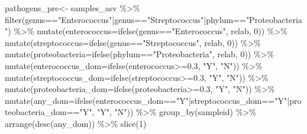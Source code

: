 \documentclass[
]{book}
\newenvironment{Shaded}{\begin{snugshade}}{\end{snugshade}}
\newcommand{\AttributeTok}[1]{\textcolor[rgb]{0.77,0.63,0.00}{#1}}
\newcommand{\DecValTok}[1]{\textcolor[rgb]{0.00,0.00,0.81}{#1}}
\newcommand{\FloatTok}[1]{\textcolor[rgb]{0.00,0.00,0.81}{#1}}
\newcommand{\FunctionTok}[1]{\textcolor[rgb]{0.00,0.00,0.00}{#1}}
\newcommand{\NormalTok}[1]{#1}
\newcommand{\OtherTok}[1]{\textcolor[rgb]{0.56,0.35,0.01}{#1}}
\newcommand{\SpecialCharTok}[1]{\textcolor[rgb]{0.00,0.00,0.00}{#1}}
\newcommand{\StringTok}[1]{\textcolor[rgb]{0.31,0.60,0.02}{#1}}
\begin{document}
\begin{Shaded}
\begin{Highlighting}[]
\NormalTok{pathogens\_pre}\OtherTok{\textless{}{-}}\NormalTok{ samples\_asv }\SpecialCharTok{\%\textgreater{}\%} 
  \FunctionTok{filter}\NormalTok{(genus}\SpecialCharTok{==}\StringTok{"Enterococcus"}\SpecialCharTok{|}\NormalTok{genus}\SpecialCharTok{==}\StringTok{"Streptococcus"}\SpecialCharTok{|}\NormalTok{phylum}\SpecialCharTok{==}\StringTok{"Proteobacteria"}\NormalTok{) }\SpecialCharTok{\%\textgreater{}\%} 
  \FunctionTok{mutate}\NormalTok{(}\AttributeTok{enterococcus=}\FunctionTok{ifelse}\NormalTok{(genus}\SpecialCharTok{==}\StringTok{"Enterococcus"}\NormalTok{, relab, }\DecValTok{0}\NormalTok{)) }\SpecialCharTok{\%\textgreater{}\%} 
  \FunctionTok{mutate}\NormalTok{(}\AttributeTok{streptococcus=}\FunctionTok{ifelse}\NormalTok{(genus}\SpecialCharTok{==}\StringTok{"Streptococcus"}\NormalTok{, relab, }\DecValTok{0}\NormalTok{)) }\SpecialCharTok{\%\textgreater{}\%} 
  \FunctionTok{mutate}\NormalTok{(}\AttributeTok{proteobacteria=}\FunctionTok{ifelse}\NormalTok{(phylum}\SpecialCharTok{==}\StringTok{"Proteobacteria"}\NormalTok{, relab, }\DecValTok{0}\NormalTok{)) }\SpecialCharTok{\%\textgreater{}\%} 
  \FunctionTok{mutate}\NormalTok{(}\AttributeTok{enterococcus\_dom=}\FunctionTok{ifelse}\NormalTok{(enterococcus}\SpecialCharTok{\textgreater{}=}\FloatTok{0.3}\NormalTok{, }\StringTok{"Y"}\NormalTok{, }\StringTok{"N"}\NormalTok{)) }\SpecialCharTok{\%\textgreater{}\%} 
  \FunctionTok{mutate}\NormalTok{(}\AttributeTok{streptococcus\_dom=}\FunctionTok{ifelse}\NormalTok{(streptococcus}\SpecialCharTok{\textgreater{}=}\FloatTok{0.3}\NormalTok{, }\StringTok{"Y"}\NormalTok{, }\StringTok{"N"}\NormalTok{)) }\SpecialCharTok{\%\textgreater{}\%} 
   \FunctionTok{mutate}\NormalTok{(}\AttributeTok{proteobacteria\_dom=}\FunctionTok{ifelse}\NormalTok{(proteobacteria}\SpecialCharTok{\textgreater{}=}\FloatTok{0.3}\NormalTok{, }\StringTok{"Y"}\NormalTok{, }\StringTok{"N"}\NormalTok{)) }\SpecialCharTok{\%\textgreater{}\%} 
  \FunctionTok{mutate}\NormalTok{(}\AttributeTok{any\_dom=}\FunctionTok{ifelse}\NormalTok{(enterococcus\_dom}\SpecialCharTok{==}\StringTok{"Y"}\SpecialCharTok{|}\NormalTok{streptococcus\_dom}\SpecialCharTok{==}\StringTok{"Y"}\SpecialCharTok{|}\NormalTok{proteobacteria\_dom}\SpecialCharTok{==}\StringTok{"Y"}\NormalTok{, }\StringTok{"Y"}\NormalTok{, }\StringTok{"N"}\NormalTok{)) }\SpecialCharTok{\%\textgreater{}\%} 
  \FunctionTok{group\_by}\NormalTok{(sampleid) }\SpecialCharTok{\%\textgreater{}\%} 
  \FunctionTok{arrange}\NormalTok{(}\FunctionTok{desc}\NormalTok{(any\_dom)) }\SpecialCharTok{\%\textgreater{}\%} \FunctionTok{slice}\NormalTok{(}\DecValTok{1}\NormalTok{)}
\end{Highlighting}
\end{Shaded}
\end{document}
